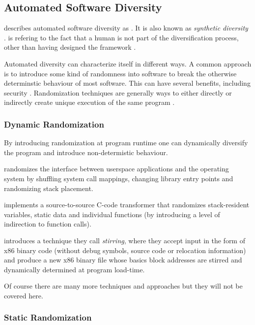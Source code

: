 \subsection{Automated Software Diversity}

\textcite{survey} describes automated software diversity as  \cite[\pno~8]{survey}. It is also
known as \textit{synthetic diversity} \cite{synthetic-diversity}.  is
refering to the fact that a human is not part of the diversification process, other than
having designed the framework \cite[Section~4]{survey}.

Automated diversity can characterize itself in different ways. A common approach is to
introduce some kind of randomness into software to break the otherwise determinstic behaviour
of most software. This can have several benefits, including security \cite{add-obfuscation}.
Randomization techniques are generally ways to either directly or indirectly create unique
execution of the same program \cite[Section~4.1]{survey}.

\subsubsection{Dynamic Randomization}

By introducing randomization at program runtime one can dynamically diversify the program
and introduce non-determistic behaviour.

\textcite{os-randomization} randomizes the interface
between userspace applications and the operating system by shuffling system call mappings,
changing library entry points and randomizing stack placement.

\textcite{mem-exploits} implements a source-to-source C-code transformer that randomizes
stack-resident variables, static data and individual functions (by introducing a level of
indirection to function calls).

\textcite{binary-stirring} introduces a technique they call \textit{stirring}, where
they accept input in the form of x86 binary code (without debug symbols, source code or
relocation information) and produce a new x86 binary file whose basics block addresses
are stirred and dynamically determined at program load-time.

Of course there are many more techniques and approaches but they will not be covered here.

\subsubsection{Static Randomization}

